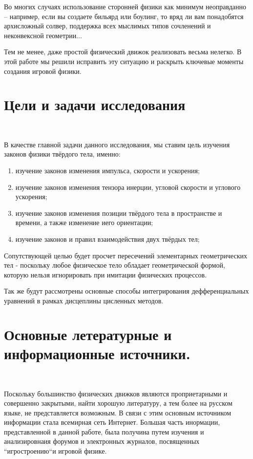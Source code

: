 Во многих случаях использование сторонней
физики как минимум неоправданно – например, если вы
создаете бильярд или боулинг, то вряд ли вам понадобятся
архисложный солвер, поддержка всех мыслимых типов
сочленений и неконвексной геометрии...

Тем не менее, даже простой физический движок
реализовать весьма нелегко. В этой работе мы решили исправить эту
ситуацию и раскрыть ключевые моменты создания игровой физики.

\section{Цели и задачи исследования} 
\

В качестве главной задачи данного исследования, мы ставим цель
изучения законов физики твёрдого тела,  именно:

\begin{enumerate}
\item изучение законов изменения импульса, скорости и ускорения; \\
\item изучение законов изменения тензора инерции, угловой скорости
и углового ускорения; \\ 
\item изучение законов изменения позиции твёрдого тела в пространстве
и времени, а также изменение иего ориентации; \\
\item изучение законов и правил взаимодействия двух твёрдых тел; \\
\end{enumerate}

Сопутствующей целью будет просчет пересечений элементарных 
геометрических тел - поскольку любое физическое тело обладает
геометрической формой, которую нельзя игнорировать при имитации 
физических процессов.

Так же будут рассмотрены основные способы интегрирования
дефференциальных уравнений в рамках дисцеплины цисленных методов.

\section{Основные летературные и информационные источники.}
\

Поскольку большинство физических движков являются проприетарными
и совершенно закрытыми, найти хорошую литературу, а тем более
на русском языке, не представляется возможным. В связи с этим основным
источником информации стала всемирная сеть Интернет. Большая часть 
инормации, представленной в данной работе, была получина путем изучения
и анализировнаия форумов и электронных журналов, посвященных
``игростроению``и игровой физике.

